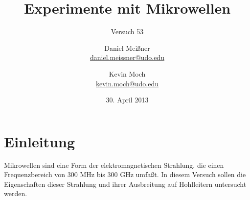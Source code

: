 

\newcommand{\name}[1]{\textsc{#1}}
\renewcommand{\d}{\ensuremath{\mathrm{d}}}

\titlehead{{TU Dortmund \hfill SS~14\\}
Fakultät Physik\\
Fortgeschrittenenpraktikum}

\subject{Versuchsprotokoll}
\title{Experimente mit Mikrowellen}
\subtitle{Versuch 53}

\author{Daniel Meißner\\
{\normalsize\url{daniel.meissner@udo.edu}}
\and
Kevin Moch\\
{\normalsize\url{kevin.moch@udo.edu}}}

\date{30. April 2013}

\maketitle

\tableofcontents
\clearpage

\section{Einleitung}
Mikrowellen sind eine Form der elektromagnetischen Strahlung, die einen
Frequenzbereich von 300 MHz bis 300 GHz umfaßt.  In diesem Versuch
sollen die Eigenschaften dieser Strahlung und ihrer Ausbreitung auf
Hohlleitern untersucht werden.






\printbibliography
\nocite{v053}


